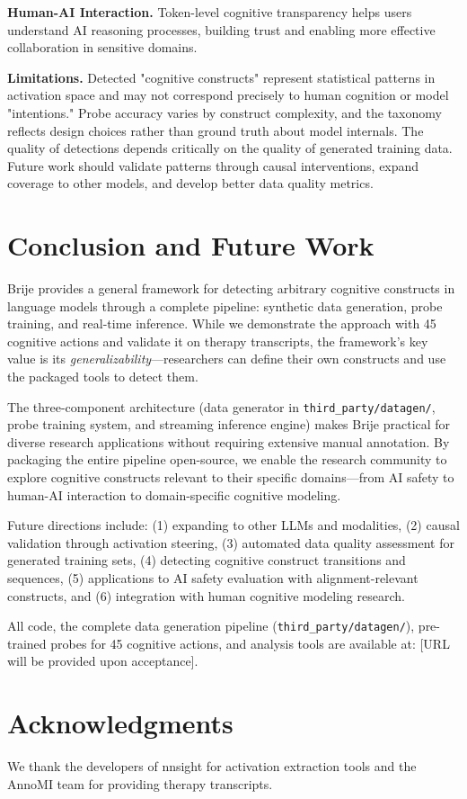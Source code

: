\documentclass[letterpaper]{article}
\begin{document}
\textbf{Human-AI Interaction.} Token-level cognitive transparency helps users understand AI reasoning processes, building trust and enabling more effective collaboration in sensitive domains.

\textbf{Limitations.} Detected "cognitive constructs" represent statistical patterns in activation space and may not correspond precisely to human cognition or model "intentions." Probe accuracy varies by construct complexity, and the taxonomy reflects design choices rather than ground truth about model internals. The quality of detections depends critically on the quality of generated training data. Future work should validate patterns through causal interventions, expand coverage to other models, and develop better data quality metrics.

\section{Conclusion and Future Work}

Brije provides a general framework for detecting arbitrary cognitive constructs in language models through a complete pipeline: synthetic data generation, probe training, and real-time inference. While we demonstrate the approach with 45 cognitive actions and validate it on therapy transcripts, the framework's key value is its \emph{generalizability}—researchers can define their own constructs and use the packaged tools to detect them.

The three-component architecture (data generator in \texttt{third\_party/datagen/}, probe training system, and streaming inference engine) makes Brije practical for diverse research applications without requiring extensive manual annotation. By packaging the entire pipeline open-source, we enable the research community to explore cognitive constructs relevant to their specific domains—from AI safety to human-AI interaction to domain-specific cognitive modeling.

Future directions include: (1) expanding to other LLMs and modalities, (2) causal validation through activation steering, (3) automated data quality assessment for generated training sets, (4) detecting cognitive construct transitions and sequences, (5) applications to AI safety evaluation with alignment-relevant constructs, and (6) integration with human cognitive modeling research.

All code, the complete data generation pipeline (\texttt{third\_party/datagen/}), pre-trained probes for 45 cognitive actions, and analysis tools are available at: [URL will be provided upon acceptance].

\section*{Acknowledgments}
We thank the developers of nnsight for activation extraction tools and the AnnoMI team for providing therapy transcripts.


\end{document}
